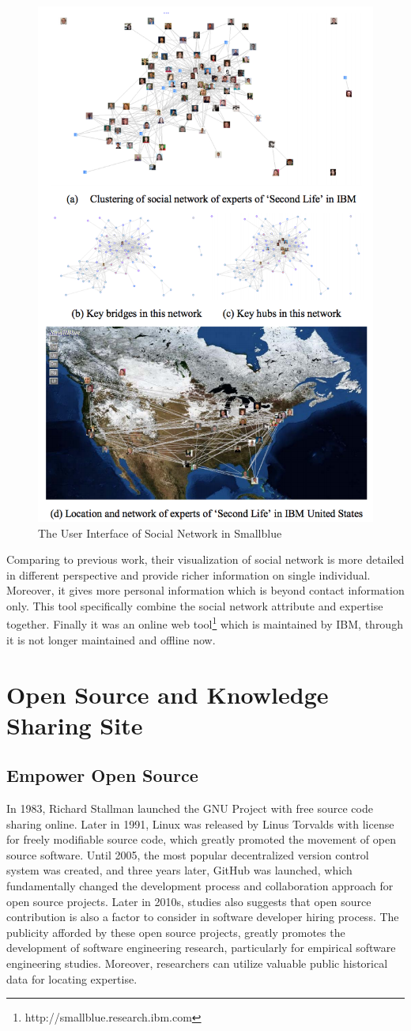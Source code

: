 \begin{figure}
\includegraphics[width = 0.6\columnwidth]{smallblue.png}
\centering
\caption{The User Interface of Social Network in Smallblue \cite{lin2009smallblue}}
\label{Smallblue}
\end{figure}

Comparing to previous work, their visualization of social network is more detailed in different perspective and provide richer information on single individual. Moreover, it gives more personal information which is beyond contact information only. This tool specifically combine the social network attribute and expertise together. Finally it was an online web tool\footnote{http://smallblue.research.ibm.com} which is maintained by IBM, through it is not longer maintained and offline now.

\section{Open Source and Knowledge Sharing Site}

\subsection{Empower Open Source}

In 1983, Richard Stallman launched the GNU Project with free source code sharing online. Later in 1991, Linux was released by Linus Torvalds with license for freely modifiable source code, which greatly promoted the movement of open source software. Until 2005, the most popular decentralized version control system was created, and three years later, GitHub was launched, which fundamentally changed the development process and collaboration approach for open source projects. Later in 2010s, studies also suggests that open source contribution is also a factor to consider in software developer hiring process. The publicity afforded by these open source projects, greatly promotes the development of software engineering research, particularly for empirical software engineering studies. Moreover, researchers can utilize valuable public historical data for locating expertise. 

